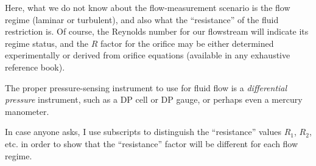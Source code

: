 
Here, what we do not know about the flow-measurement scenario is the flow regime (laminar or turbulent), and also what the ``resistance'' of the fluid restriction is.  Of course, the Reynolds number for our flowstream will indicate its regime status, and the $R$ factor for the orifice may be either determined experimentally or derived from orifice equations (available in any exhaustive reference book).

\vskip 10pt

The proper pressure-sensing instrument to use for fluid flow is a {\it differential pressure} instrument, such as a DP cell or DP gauge, or perhaps even a mercury manometer.








In case anyone asks, I use subscripts to distinguish the ``resistance'' values $R_1$, $R_2$, etc. in order to show that the ``resistance'' factor will be different for each flow regime.




